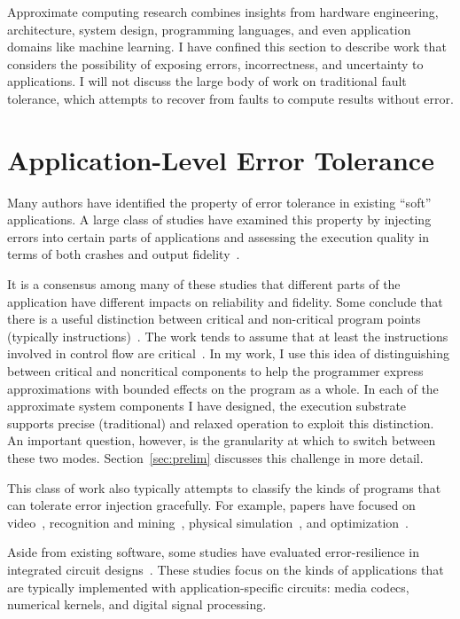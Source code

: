 Approximate computing research combines insights from hardware engineering,
architecture, system design, programming languages, and even application
domains like machine learning. I have confined this section to describe work
that considers the possibility of exposing errors, incorrectness, and
uncertainty to applications. I will not discuss the large body of work on
traditional fault tolerance, which attempts to recover from faults to compute
results without error.

\section{Application-Level Error Tolerance}
\label{sec:related:studies}

Many authors have identified the property of error tolerance in existing
``soft''
applications. A large class of studies have examined this property by
injecting errors into certain parts of applications and assessing the
execution quality in terms of both crashes and output fidelity~\cite{li06,
li07, li08, dekruijf-selse09, wong-selse06, palem-arcs, freton, besteffort,
yeh, thaker-iiswc06, efc, llfi, chippa-dac}.

It is a consensus among many of these studies that different parts of the
application have different impacts on reliability and fidelity. Some conclude
that there is a useful distinction between critical and non-critical program
points (typically instructions)~\cite{palem-arcs, thaker-iiswc06, flikker,
llfi}.
The work tends to assume that at least the instructions involved in control
flow are critical~\cite{thaker-iiswc06}. In my work, I use this idea of
distinguishing between critical and noncritical components to help the
programmer express approximations with bounded effects on the program as a
whole. In each of the approximate system components I have designed, the
execution substrate supports precise (traditional) and relaxed operation to
exploit this distinction. An important question, however, is the granularity
at which to switch between these two modes. Section~\ref{sec:prelim} discusses
this challenge in more detail.

This class of work also typically attempts to classify the kinds of programs
that can tolerate error injection gracefully. For example, papers have focused
on video~\cite{freton}, recognition and mining~\cite{besteffort}, physical
simulation~\cite{yeh}, and optimization~\cite{hogwild}.

Aside from existing software, some studies have evaluated error-resilience in
integrated circuit designs~\cite{breuer, scalable-effort-hardware}. These
studies focus on the kinds of applications that are typically implemented with
application-specific circuits: media codecs, numerical kernels, and digital
signal processing.


